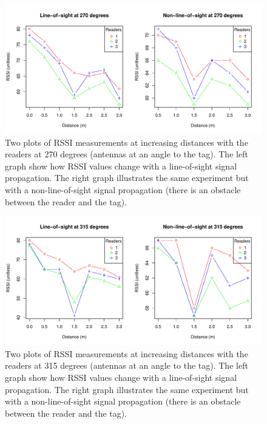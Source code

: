 \begin{figure}[H]
	\begin{center}
		\includegraphics[width=1\textwidth]{figures/rssi_distance_3m_270deg}
		\caption{Two plots of RSSI measurements at increasing distances with the readers at 270 degrees (antennas at an angle to the tag). The left graph show how RSSI values change with a line-of-sight signal propagation. The right graph illustrates the same experiment but with a non-line-of-sight signal propagation (there is an obstacle between the reader and the tag).}
	\end{center}
\end{figure}

\begin{figure}[H]
	\begin{center}
		\includegraphics[width=1\textwidth]{figures/rssi_distance_3m_315deg}
		\caption{Two plots of RSSI measurements at increasing distances with the readers at 315 degrees (antennas at an angle to the tag). The left graph show how RSSI values change with a line-of-sight signal propagation. The right graph illustrates the same experiment but with a non-line-of-sight signal propagation (there is an obstacle between the reader and the tag).}
	\end{center}
\end{figure}


